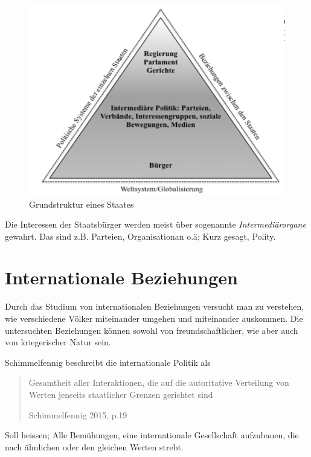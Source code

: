 \documentclass[a4paper, 11pt]{article}
\begin{document}
\begin{figure}[htb]
    \centering
    \includegraphics[keepaspectratio=true,height=10\baselineskip]{analytische_grundstruktur.png}
    \caption{Grundstruktur eines Staates}
    \label{fig:grundstrk_staat}
\end{figure}

Die Interessen der Staatsbürger werden meist über sogenannte \textit{Intermediärorgane} gewahrt. Das sind z.B. Parteien, Organisationan o.ä; Kurz gesagt, Polity.

\newpage

\section{Internationale Beziehungen}

Durch das Studium von internationalen Beziehungen versucht man zu verstehen, wie verschiedene Völker miteinander umgehen und miteinander auskommen. Die untersuchten Beziehungen können sowohl von freundschaftlicher, wie aber auch von kriegerischer Natur sein.

\vspace{10px}

Schimmelfennig beschreibt die internationale Politik als \blockquote[Schimmelfennig 2015, p.19]{Gesamtheit aller Interaktionen, die auf die autoritative Verteilung von Werten jenseits staatlicher Grenzen gerichtet sind}. Soll heissen; Alle Bemühungen, eine internationale Gesellschaft aufzubauen, die nach ähnlichen oder den gleichen Werten strebt.

\vspace{10px}
\end{document}
